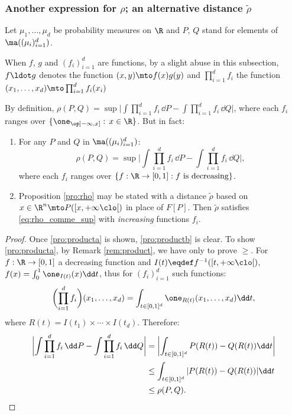 \subsubsection{Another expression for $\rho$; an alternative distance $\tilde \rho$}\label{ss:another}

Let $\mu_1,\ldots,\mu_d$ be probability measures on $\R$ and $P$, $Q$ stand for elements of $\ma((\mu_i)_{i=1}^d)$.

\begin{notation} When $f$, $g$ and $(f_i)_{i=1}^d$ are functions, by a slight abuse in this subsection, $f\ldot g$ denotes the function $(x,y)\mto f(x)g(y)$ and\/ $\prod_{i=1}^df_i$ the function $(x_1,\ldots ,x_d)\mto \prod_{i=1}^df_i(x_i)$
\end{notation}

\begin{rem}\label{rem:product}By definition, $\rho(P,Q)=\sup\bigl|\int \prod_{i=1}^df_i \,\dd P-\int \prod_{i=1}^df_i \,\dd Q \bigr|$, where each $f_i$ ranges over $\{\one_{\op]-\infty,x]}:\,x\in\R\}$. But in fact:
\end{rem}

\skpt
\begin{prodefinition}\label{pro:product}
\begin{enumerate}
\item\label{pro:producta}
For any $P$ and $Q$ in $\ma((\mu_i)_{i=1}^d)$:\vspace*{-3pt}
\begin{equation}\label{eq:rho_comme_sup}
\rho(P,Q)=\sup\biggl|\int\prod_{i=1}^df_i \,\dd P-\int \prod_{i=1}^df_i \,\dd Q \biggr|,
\end{equation}
where each $f_i$ ranges over $\{f:\R\to[0,1]: f\text{ is decreasing}\}$.

\item\label{pro:productb}
Proposition \ref{pro:rho} may be stated with a distance $\tilde\rho$ based on $x\in \R^n\mto P([x,+\infty\clo[)$ in place of $F[P]$. Then $\tilde\rho$ satisfies \eqref{eq:rho_comme_sup} with \emph{increasing} functions $f_i$.
\end{enumerate}
\end{prodefinition}

\begin{proof}
Once \eqref{pro:producta} is shown, \eqref{pro:productb} is clear. To show \eqref{pro:producta}, by Remark \ref{rem:product}, we have only to prove $\geqslant$. For $f:\R\to [0,1]$ a decreasing function and $I(t)\eqdef f^{-1}([t,+\infty\clo[)$, $f(x)=\int_0^1 \one_{I(t)}(x)\dd t$, thus for $(f_i)_{i=1}^d$ such functions:
\[\biggl(\prod_{i=1}^df_i\biggr) (x_1,\ldots, x_d)=\int_{t\in[0,1]^d}\one_{R(t)}(x_1,\ldots,x_d)\dd t,\]
where $R(t)=I(t_1)\times\cdots\times I(t_d)$. Therefore:
\begin{align*}
\biggl|\int \prod_{i=1}^d f_i\,\dd P-\int \prod_{i=1}^d f_i \,\dd Q\biggr|&=\biggl|\int_{t\in[0,1]^d}P(R(t))-Q(R(t))\dd t\biggr|\\
&\leq \int_{t\in[0,1]^d}|P(R(t))-Q(R(t))|\dd t\\
&\leq \rho(P,Q).\qedhere
\end{align*}
\end{proof}

